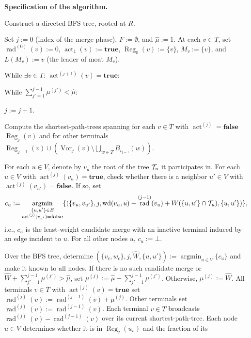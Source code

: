 \documentclass[letterpaper,11pt]{article}
\DeclareMathOperator{\act}{act}
\DeclareMathOperator{\moat}{rad}
\DeclareMathOperator{\Wd}{wd}
\DeclareMathOperator{\reg}{Reg}
\DeclareMathOperator{\vor}{Vor}
\DeclareMathOperator*{\argmin}{argmin}
\newcommand{\true}{\mathbf{true}}
\newcommand{\false}{\mathbf{false}}
\renewcommand{\paragraph}[1]{\smallskip\par\noindent\textbf{#1}}
\begin{document}
\paragraph{Specification of the algorithm.}
\begin{compactenum}
\item Construct a directed BFS tree, rooted at $R$.
\item Set $j:=0$ (index of the merge phase), $F:=\emptyset$, and
$\hat{\mu}:=1$. At each $v\in T$, set $\moat^{(0)}(v):=0$, $\act_1(v):=\true$,
$\reg_0(v):=\{v\}$, $M_v:=\{v\}$, and $L(M_v):=v$ (the leader of moat $M_v$).
\item While $\exists v\in T:\, \act^{(j+1)}(v)=\true$:
\begin{compactenum}
\item While $\sum_{j'=1}^{j-1}\mu^{(j')}<\hat{\mu}$:
\begin{compactenum}
\item $j:=j+1$.
\item Compute the shortest-path-trees spanning for each $v\in T$
with $\act^{(j)}=\false$ $\reg_j(v)$ and for other terminals
$\reg_{j-1}(v)\cup (\vor_j(v)\setminus \bigcup_{w\in T}B_{i_{j-1}}(w))$.
\item For each $u\in V$, denote by $v_u$ the root of the tree ${\cal T}_u$ it
participates in. For each $u\in V$ with $\act^{(j)}(v_u)=\true$, check whether there
is a neighbor $u'\in V$ with $\act^{(j)}(v_{u'})=\false$. If so, set
\begin{equation*}
c_u:=\argmin\limits_{\substack{\{u,u'\}\in E\\ \act^{(j)}(v_{u'})=\false}}
\{(\{v_u,v_{u'}\},j,\Wd(v_u,u)-\moat^{(j-1)}(v_u)+W(\{u,u'\}\cap
{\cal T}_u),\{u,u'\})\},
\end{equation*}
i.e., $c_u$ is the least-weight candidate merge with an inactive terminal
induced by an edge incident to $u$. For all other nodes $u$, $c_u:=\bot$.
\item Over the BFS tree, determine
$(\{v_c,w_c\},j,\hat{W},\{u,u'\}):=\argmin_{u\in V}\{c_u\}$ and make it known to
all nodes. If there is no such candidate merge or
$\hat{W}+\sum_{j'=1}^{j-1}\mu^{(j')}>\hat{\mu}$, set
$\mu^{(j)}:=\hat{\mu}-\sum_{j'=1}^{j-1}\mu^{(j')}$. Otherwise,
$\mu^{(j)}:=\hat{W}$. All terminals $v\in T$ with $\act^{(j)}(v)=\true$ set
$\moat^{(j)}(v):=\moat^{(j-1)}(v)+\mu^{(j)}$. Other terminals set
$\moat^{(j)}(v):=\moat^{(j-1)}(v)$. Each terminal $v\in T$ broadcasts
$\moat^{(j)}(v)-\moat^{(j-1)}(v)$ over its current shortest-path-tree. Each node
$u\in V$ determines whether it is in $\reg_j(u_v)$ and the fraction of its

\end{compactenum}
\end{compactenum}
\end{compactenum}
\end{document}
